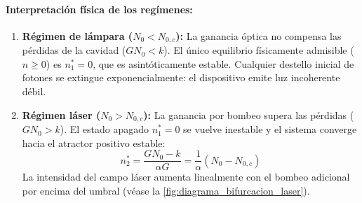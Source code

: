 \paragraph{Interpretación física de los regímenes:}
\begin{enumerate}
    \item \textbf{Régimen de lámpara ($N_0 < N_{0,c}$):} La ganancia óptica no compensa las pérdidas de la cavidad ($G N_0 < k$). El único equilibrio físicamente admisible ($n \ge 0$) es $n_1^* = 0$, que es asintóticamente estable. Cualquier destello inicial de fotones se extingue exponencialmente: el dispositivo emite luz incoherente débil.
    \item \textbf{Régimen láser ($N_0 > N_{0,c}$):} La ganancia por bombeo supera las pérdidas ($G N_0 > k$). El estado apagado $n_1^* = 0$ se vuelve inestable y el sistema converge hacia el atractor positivo estable:
    \begin{equation}
        n_2^* = \frac{G N_0 - k}{\alpha G} = \frac{1}{\alpha}\left(N_0 - N_{0,c}\right)
    \end{equation}
    La intensidad del campo láser aumenta linealmente con el bombeo adicional por encima del umbral (véase la \cref{fig:diagrama_bifurcacion_laser}).
\end{enumerate}

